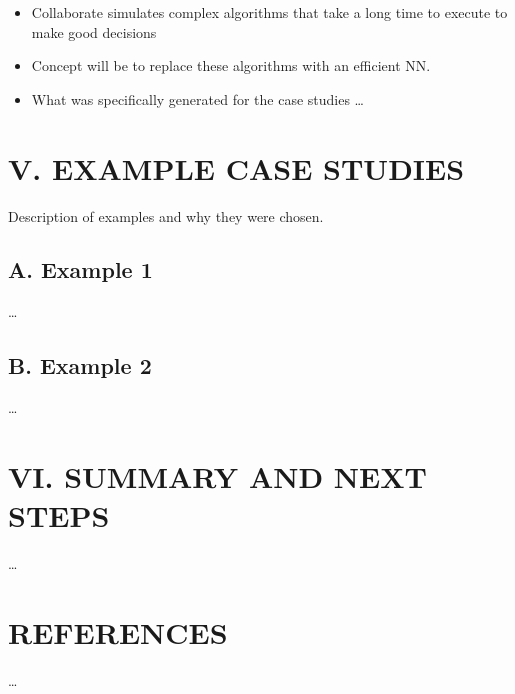 \documentclass[11pt]{article}
\begin{document}
\begin{itemize}
\item Collaborate simulates complex algorithms that take a long time to execute to
make good decisions

\item Concept will be to replace these algorithms with an efficient NN.

\item What was specifically generated for the case studies \ldots{}
\end{itemize}

\section*{V. EXAMPLE CASE STUDIES}
\label{sec:orge36aab2}

Description of examples and why they were chosen.

\subsection*{A. Example 1}
\label{sec:org36a3b5d}

\ldots{}

\subsection*{B. Example 2}
\label{sec:org2e22b52}

\ldots{}

\section*{VI. SUMMARY AND NEXT STEPS}
\label{sec:org943e16e}

\ldots{}

\section*{REFERENCES}
\label{sec:orgcd710be}

\ldots{}
\end{document}
